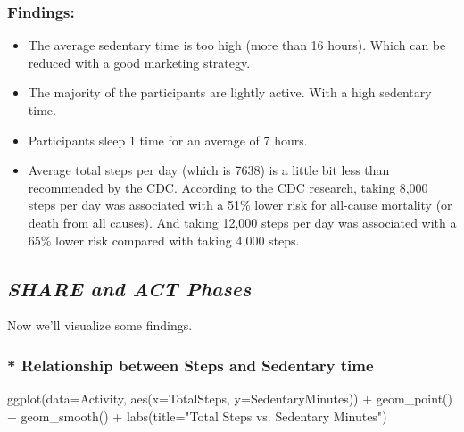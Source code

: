 \documentclass[
]{article}
\newenvironment{Shaded}{\begin{snugshade}}{\end{snugshade}}
\newcommand{\AttributeTok}[1]{\textcolor[rgb]{0.77,0.63,0.00}{#1}}
\newcommand{\FunctionTok}[1]{\textcolor[rgb]{0.00,0.00,0.00}{#1}}
\newcommand{\NormalTok}[1]{#1}
\newcommand{\SpecialCharTok}[1]{\textcolor[rgb]{0.00,0.00,0.00}{#1}}
\newcommand{\StringTok}[1]{\textcolor[rgb]{0.31,0.60,0.02}{#1}}
\providecommand{\tightlist}{%
  \setlength{\itemsep}{0pt}\setlength{\parskip}{0pt}}
\begin{document}
\hypertarget{findings}{%
\subsubsection{Findings:}\label{findings}}

\begin{itemize}
\tightlist
\item
  The average sedentary time is too high (more than 16 hours). Which can
  be reduced with a good marketing strategy.
\item
  The majority of the participants are lightly active. With a high
  sedentary time.
\item
  Participants sleep 1 time for an average of 7 hours.
\item
  Average total steps per day (which is 7638) is a little bit less than
  recommended by the CDC. According to the CDC research, taking 8,000
  steps per day was associated with a 51\% lower risk for all-cause
  mortality (or death from all causes). And taking 12,000 steps per day
  was associated with a 65\% lower risk compared with taking 4,000
  steps.
\end{itemize}

\hypertarget{share-and-act-phases}{%
\subsection{\texorpdfstring{\textbf{\emph{SHARE and ACT
Phases}}}{SHARE and ACT Phases}}\label{share-and-act-phases}}

Now we'll visualize some findings.

\hypertarget{relationship-between-steps-and-sedentary-time}{%
\subsubsection{\texorpdfstring{* \textbf{Relationship between Steps and
Sedentary
time}}{* Relationship between Steps and Sedentary time}}\label{relationship-between-steps-and-sedentary-time}}

\begin{Shaded}
\begin{Highlighting}[]
\FunctionTok{ggplot}\NormalTok{(}\AttributeTok{data=}\NormalTok{Activity, }\FunctionTok{aes}\NormalTok{(}\AttributeTok{x=}\NormalTok{TotalSteps, }\AttributeTok{y=}\NormalTok{SedentaryMinutes)) }\SpecialCharTok{+} \FunctionTok{geom\_point}\NormalTok{() }\SpecialCharTok{+} \FunctionTok{geom\_smooth}\NormalTok{() }\SpecialCharTok{+} \FunctionTok{labs}\NormalTok{(}\AttributeTok{title=}\StringTok{"Total Steps vs. Sedentary Minutes"}\NormalTok{)}
\end{Highlighting}
\end{Shaded}
\end{document}
